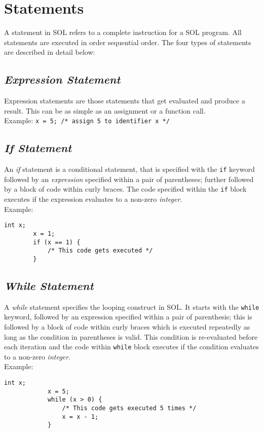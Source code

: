 \section{Statements}
A statement in SOL refers to a complete instruction for a SOL program. All statements are executed in order sequential order. The four types of statements are described in detail below:\\

    \subsection{\textit{Expression Statement}}
    Expression statements are those statements that get evaluated and produce a result. This can be as simple as an assignment or a function call.\\
    Example: \texttt{x = 5; /* assign 5 to identifier x */}

    \subsection{\textit{If Statement}}
    An \textit{if} statement is a conditional statement, that is specified with the \texttt{if} keyword followed by an \textit{expression} specified within a pair of parentheses; further followed by a block of code within curly braces. The code specified within the \texttt{if} block executes if the expression evaluates to a non-zero \textit{integer}.\\
    Example:\\
    \begin{lstlisting}[style=sol]
        int x;
        x = 1;
        if (x == 1) {
            /* This code gets executed */
        }
    \end{lstlisting}

    \subsection{\textit{While Statement}}
    A \textit{while} statement specifies the looping construct in SOL. It starts with the \texttt{while} keyword, followed by an expression specified within a pair of parenthesis; this is followed by a block of code within curly braces which is executed repeatedly as long as the condition in parentheses is valid. This condition is re-evaluated before each iteration and the code within \texttt{while} block executes if the condition evaluates to a non-zero \textit{integer}. \\
    Example:\\
    \begin{lstlisting}[style=sol]
            int x;
            x = 5;
            while (x > 0) {
                /* This code gets executed 5 times */
                x = x - 1;
            }
        \end{lstlisting}

